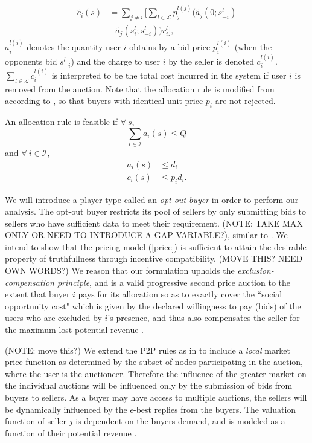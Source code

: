 \documentclass[12pt]{article}
\theoremstyle{definition}
\newcommand{\mcL}{\mathcal{L}}
\newcommand{\mcI}{\mathcal{I}}
\begin{document}
\begin{multicols}{2}
\begin{align*}
    \tilde{c_i}(s) &= \displaystyle\sum_{j\ne i}\bigg\lbrack\sum_{l\in\mcL}
p_j^{l(j)} \bigg(\tilde{a_j}(0; s_{-i}^l)\\
    &-\tilde{a_j}(s_i^l;s_{-i}^l)\bigg) r_i^l\bigg\rbrack,
\end{align*}
 $a_i^{l(i)}$ denotes the quantity user $i$ obtains by a bid price
$p_i^{l(i)}$ (when the
opponents bid $s_{−i}^l$) and the charge to user $i$ by the seller is denoted
$c_i^{l(i)}$. $\sum_{l\in\mcL} c_i^{l(i)}$ is interpreted to be the total cost incurred in the system if
user $i$ is removed from the auction. Note that the allocation rule is modified
from \cite{lazar} according to \cite{tuffin}, so that buyers with identical unit-price
$p_i$ are not rejected.

An allocation rule is feasible \cite{lazar} if $\forall \ s$,
$$
    \displaystyle\sum_{i\in\mcI} a_i(s) \le Q
$$
and $\forall \ i\in\mcI$,
\begin{align*}
    a_i(s) &\le d_i \\
    c_i(s) &\le p_id_i.
\end{align*}

We will introduce a player type called an \emph{opt-out buyer} in order to perform our analysis. The
opt-out buyer restricts its pool of sellers by only submitting bids to sellers
who have sufficient data to meet their requirement.
(NOTE: TAKE MAX ONLY OR NEED TO INTRODUCE
A GAP VARIABLE?), similar to \cite{zheng}. 
We intend to show that the pricing model (\ref{price}) is sufficient to attain the desirable
property of truthfullness through incentive compatibility. (MOVE THIS? NEED OWN
WORDS?) We
reason that our formulation upholds the \emph{exclusion-compensation
principle}, and is a valid progressive second price auction to the extent that buyer $i$
pays for its allocation so as to exactly cover the ``social opportunity cost" which is given by the declared willingness to pay (bids) of the users who are excluded by $i$'s
presence, and thus also compensates the seller for the maximum lost potential
revenue \cite{lazar}.

(NOTE: move this?)
We extend the P2P rules as in \cite{semret} to include a \emph{local} market
price function as determined by the subset of nodes participating in the
auction, where the user is the auctioneer. Therefore the influence of the greater market on the individual
auctions will be influenced only by the submission of bids from buyers to
sellers. As a buyer may have access to multiple auctions, the sellers will be
dynamically influenced by the $\epsilon$-best replies from the buyers. The
valuation function of seller $j$ is dependent on the buyers demand, and is
modeled as a function of their potential revenue \cite{semret}. 


\end{multicols}
\end{document}
